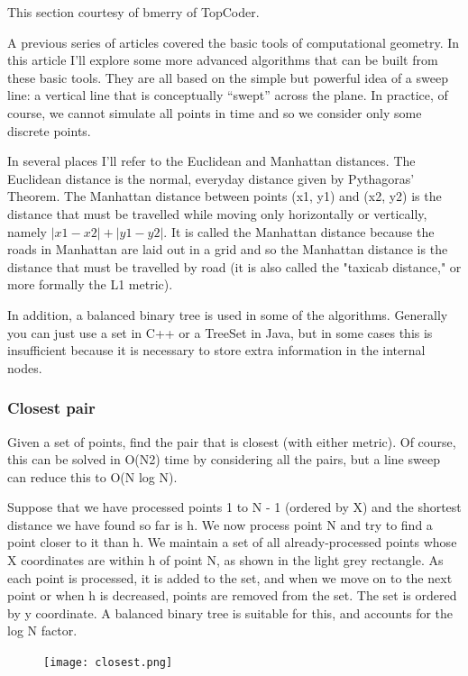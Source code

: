 \documentclass[a4paper,12pt]{article}
\begin{document}
This section courtesy of bmerry of TopCoder.

A previous series of articles covered the basic tools of computational geometry. In 
this article I'll explore some more advanced algorithms that can be built from these basic 
tools. They are all based on the simple but powerful idea of a sweep line: a vertical line 
that is conceptually “swept” across the plane. In practice, of course, we cannot simulate 
all points in time and so we consider only some discrete points.

In several places I'll refer to the Euclidean and Manhattan distances. The Euclidean 
distance is the normal, everyday distance given by Pythagoras' Theorem. The Manhattan 
distance between points (x1, y1) and (x2, y2) is the distance that must be travelled while 
moving only horizontally or vertically, namely $|x1 − x2| + |y1 − y2|$. It is called the 
Manhattan distance because the roads in Manhattan are laid out in a grid and so the 
Manhattan distance is the distance that must be travelled by road (it is also called the 
"taxicab distance," or more formally the L1 metric).

In addition, a balanced binary tree is used in some of the algorithms. Generally you can 
just use a set in C++ or a TreeSet in Java, but in some cases this is insufficient because 
it is necessary to store extra information in the internal nodes.

\subsubsection{Closest pair} \indent

Given a set of points, find the pair that is closest (with either metric). Of course, this can be solved in O(N2) time by considering all the pairs, but a line sweep can reduce this to O(N log N).

Suppose that we have processed points 1 to N - 1 (ordered by X) and the shortest distance we have found so far is h. We now process point N and try to find a point closer to it than h. We maintain a set of all already-processed points whose X coordinates are within h of point N, as shown in the light grey rectangle. As each point is processed, it is added to the set, and when we move on to the next point or when h is decreased, points are removed from the set. The set is ordered by y coordinate. A balanced binary tree is suitable for this, and accounts for the log N factor.

\begin{figure}[ht]
  \centering
  \texttt{[image: closest.png]}
\end{figure}
\end{document}
